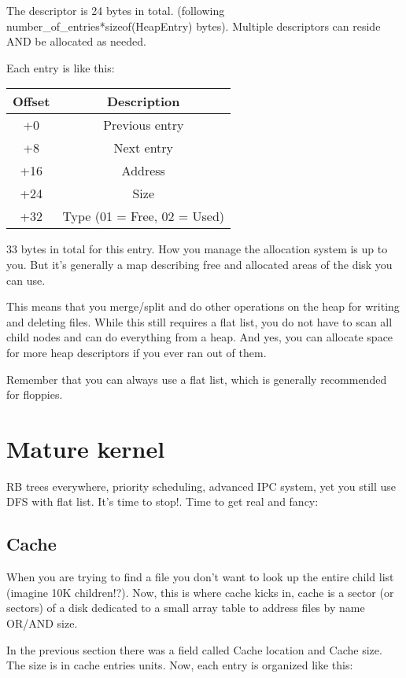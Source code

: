 \documentclass[12pt]{article}
\begin{document}
The descriptor is 24 bytes in total. (following number\_of\_entries*sizeof(HeapEntry) bytes). Multiple descriptors can reside AND be allocated as needed.

Each entry is like this:
\begin{center}
\begin{tabular}{ |c|c| }
\hline
Offset & Description \\
\hline
+0 & Previous entry \\
+8 & Next entry \\
+16 & Address \\
+24 & Size \\
+32 & Type (01 = Free, 02 = Used) \\
\hline
\end{tabular}
\end{center}

33 bytes in total for this entry. How you manage the allocation system is up to you. But it's generally a map describing free and allocated areas of the disk you can use.

This means that you merge/split and do other operations on the heap for writing and deleting files. While this still requires a flat list, you do not have to scan all child nodes and can do everything from a heap. And yes, you can allocate space for more heap descriptors if you ever ran out of them.

Remember that you can always use a flat list, which is generally recommended for floppies.

\section{Mature kernel}

RB trees everywhere, priority scheduling, advanced IPC system, yet you still use DFS with flat list. It's time to stop!. Time to get real and fancy:

\subsection{Cache}
When you are trying to find a file you don't want to look up the entire child list (imagine 10K children!?). Now, this is where cache kicks in, cache is a sector (or sectors) of a disk dedicated to a small array table to address files by name OR/AND size.

In the previous section there was a field called Cache location and Cache size. The size is in cache entries units. Now, each entry is organized like this:
\end{document}
